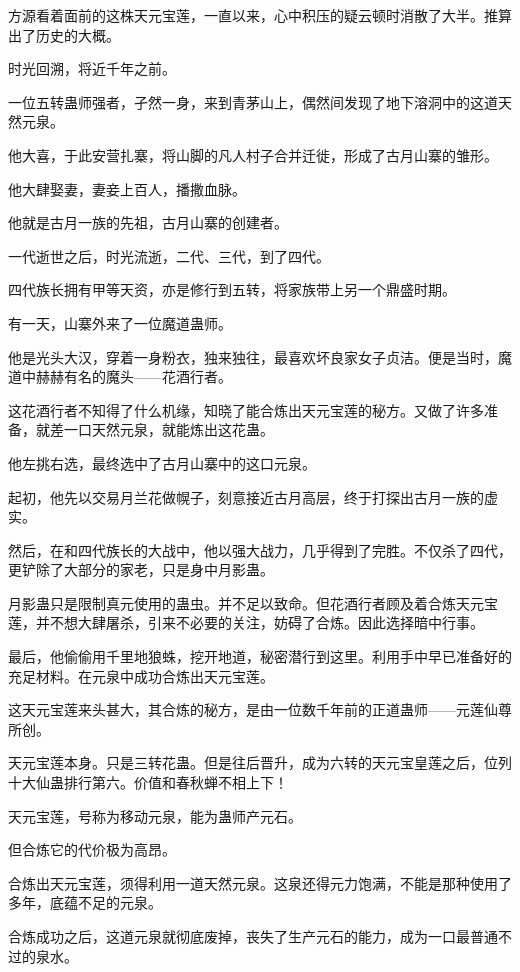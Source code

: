 
\begin{this_body}

方源看着面前的这株天元宝莲，一直以来，心中积压的疑云顿时消散了大半。推算出了历史的大概。

时光回溯，将近千年之前。

一位五转蛊师强者，孑然一身，来到青茅山上，偶然间发现了地下溶洞中的这道天然元泉。

他大喜，于此安营扎寨，将山脚的凡人村子合并迁徙，形成了古月山寨的雏形。

他大肆娶妻，妻妾上百人，播撒血脉。

他就是古月一族的先祖，古月山寨的创建者。

一代逝世之后，时光流逝，二代、三代，到了四代。

四代族长拥有甲等天资，亦是修行到五转，将家族带上另一个鼎盛时期。

有一天，山寨外来了一位魔道蛊师。

他是光头大汉，穿着一身粉衣，独来独往，最喜欢坏良家女子贞洁。便是当时，魔道中赫赫有名的魔头——花酒行者。

这花酒行者不知得了什么机缘，知晓了能合炼出天元宝莲的秘方。又做了许多准备，就差一口天然元泉，就能炼出这花蛊。

他左挑右选，最终选中了古月山寨中的这口元泉。

起初，他先以交易月兰花做幌子，刻意接近古月高层，终于打探出古月一族的虚实。

然后，在和四代族长的大战中，他以强大战力，几乎得到了完胜。不仅杀了四代，更铲除了大部分的家老，只是身中月影蛊。

月影蛊只是限制真元使用的蛊虫。并不足以致命。但花酒行者顾及着合炼天元宝莲，并不想大肆屠杀，引来不必要的关注，妨碍了合炼。因此选择暗中行事。

最后，他偷偷用千里地狼蛛，挖开地道，秘密潜行到这里。利用手中早已准备好的充足材料。在元泉中成功合炼出天元宝莲。

这天元宝莲来头甚大，其合炼的秘方，是由一位数千年前的正道蛊师——元莲仙尊所创。

天元宝莲本身。只是三转花蛊。但是往后晋升，成为六转的天元宝皇莲之后，位列十大仙蛊排行第六。价值和春秋蝉不相上下！

天元宝莲，号称为移动元泉，能为蛊师产元石。

但合炼它的代价极为高昂。

合炼出天元宝莲，须得利用一道天然元泉。这泉还得元力饱满，不能是那种使用了多年，底蕴不足的元泉。

合炼成功之后，这道元泉就彻底废掉，丧失了生产元石的能力，成为一口最普通不过的泉水。


\end{this_body}
